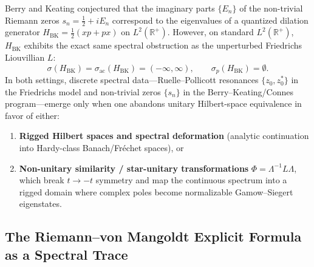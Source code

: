 \documentclass[11pt,a4paper]{article}
\begin{document}
Berry and Keating \cite{BerryKeating1999} conjectured that the imaginary parts $\{E_n\}$ of the non-trivial Riemann zeros $s_n = \frac{1}{2} + iE_n$ correspond to the eigenvalues of a quantized dilation generator $H_{\mathrm{BK}} = \frac{1}{2}(xp + px)$ on $L^2(\mathbb{R}^+)$. However, on standard $L^2(\mathbb{R}^+)$, $H_{\mathrm{BK}}$ exhibits the exact same spectral obstruction as the unperturbed Friedrichs Liouvillian $L$:
\begin{equation}
\sigma(H_{\mathrm{BK}}) = \sigma_{\mathrm{ac}}(H_{\mathrm{BK}}) = (-\infty, \infty), \qquad \sigma_p(H_{\mathrm{BK}}) = \emptyset.
\end{equation}
In both settings, discrete spectral data—Ruelle--Pollicott resonances $\{z_0, z_0^*\}$ in the Friedrichs model and non-trivial zeros $\{s_n\}$ in the Berry--Keating/Connes program—emerge only when one abandons unitary Hilbert-space equivalence in favor of either:
\begin{enumerate}
    \item \textbf{Rigged Hilbert spaces and spectral deformation} (analytic continuation into Hardy-class Banach/Fr\'echet spaces), or
    \item \textbf{Non-unitary similarity / star-unitary transformations} $\Phi = \Lambda^{-1}L\Lambda$, which break $t \to -t$ symmetry and map the continuous spectrum into a rigged domain where complex poles become normalizable Gamow--Siegert eigenstates.
\end{enumerate}

\subsection{The Riemann--von Mangoldt Explicit Formula as a Spectral Trace}
\end{document}
